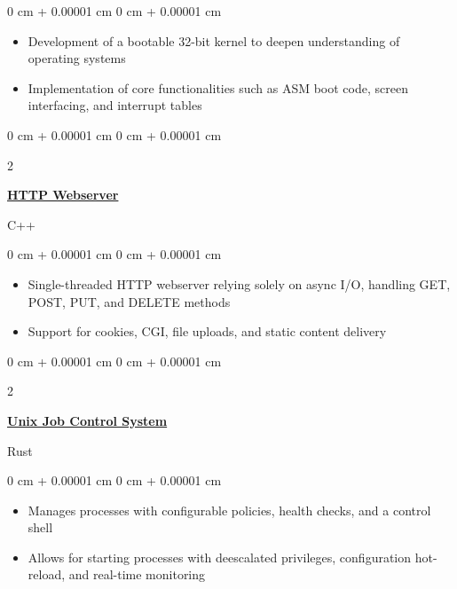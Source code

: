 \documentclass[10pt, letterpaper]{article}
\newenvironment{highlights}{
    \begin{itemize}[
        topsep=0.10 cm,
        parsep=0.10 cm,
        partopsep=0pt,
        itemsep=0pt,
        leftmargin=0 cm + 10pt
    ]
}{
    \end{itemize}
}
\newenvironment{onecolentry}{
    \begin{adjustwidth}{
        0 cm + 0.00001 cm
    }{
        0 cm + 0.00001 cm
    }
}{
    \end{adjustwidth}
}
\newenvironment{twocolentry}[2][]{
    \onecolentry
    \def\secondColumn{#2}
    \setcolumnwidth{\fill, 4.5 cm}
    \begin{paracol}{2}
}{
    \switchcolumn \raggedleft \secondColumn
    \end{paracol}
    \endonecolentry
}
\begin{document}
    \begin{onecolentry}
        \begin{highlights}
            \item Development of a bootable 32-bit kernel to deepen understanding of operating systems  
            \item Implementation of core functionalities such as ASM boot code, screen interfacing, and interrupt tables
        \end{highlights}
    \end{onecolentry}


    \vspace{0.2 cm}

    \begin{twocolentry}
        {C++}
        \href{https://github.com/winstonallo/webserv}{\textbf{HTTP Webserver}}
    \end{twocolentry}

    \vspace{0.10 cm}
    
    \begin{onecolentry}
        \begin{highlights}
            \item Single-threaded HTTP webserver relying solely on async I/O, handling GET, POST, PUT, and DELETE methods
            \item Support for cookies, CGI, file uploads, and static content delivery
        \end{highlights}
    \end{onecolentry}

    \vspace{0.2 cm}

    \begin{twocolentry}
        {Rust}
        \href{https://github.com/winstonallo/taskmaster}{\textbf{Unix Job Control System}}
    \end{twocolentry}

    \vspace{0.10 cm}
    
    \begin{onecolentry}
        \begin{highlights}
            \item Manages processes with configurable policies, health checks, and a control shell
            \item Allows for starting processes with deescalated privileges, configuration hot-reload, and real-time monitoring 
        \end{highlights}
    \end{onecolentry}
\end{document}
